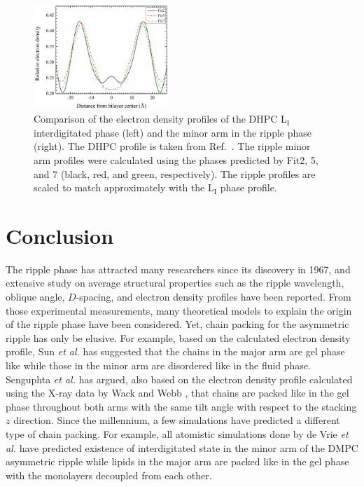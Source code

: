 \begin{figure}[htbp]
  \centering
  \includegraphics[width=0.45\textwidth]{figures/ripple/discussion/minor_edp}
  \caption{Comparison of the electron density profiles of the DHPC  
  L$_\text{I}$ interdigitated phase (left)
  and the minor arm in the ripple phase (right). The DHPC profile is taken from 
  Ref.~\cite{}. The ripple minor arm profiles were calculated 
  using the phases predicted by Fit2, 5, and 7 (black, red, and green, respectively). 
  The ripple profiles are scaled to match approximately
  with the L$_\text{I}$ phase profile.}
  \label{fig:interdigitation_comparison}
\end{figure}

\section{Conclusion}
The ripple phase has attracted many researchers since its discovery in 1967,
and extensive study on average structural properties such as 
the ripple wavelength, oblique angle, $D$-spacing, and electron density
profiles have been reported. From those experimental measurements, 
many theoretical models to explain the origin of the ripple phase have 
been considered. Yet, chain packing for the asymmetric
ripple has only be elusive. For example, based on the calculated electron
density profile, Sun \textit{et al.} \cite{ref:Sun96} 
has suggested that the chains in the major arm are gel phase like while
those in the minor arm are disordered like in the fluid phase.
Senguphta \textit{et al.} \cite{ref:Sengupta03} has argued, 
also based on the electron density profile calculated
using the X-ray data by Wack and Webb \cite{ref:Wack89}, 
that chains are packed like in the gel phase 
throughout both arms with the same tilt angle with respect to the stacking
$z$ direction. 
Since the millennium, a few simulations
have predicted a different type of chain packing. For example, all atomistic simulations
done by de Vrie \textit{et al.} \cite{ref:deVries05} have predicted existence 
of interdigitated state in the minor arm of the DMPC asymmetric ripple 
while lipids in the major arm are packed like in the gel phase with
the monolayers decoupled from each other.  

